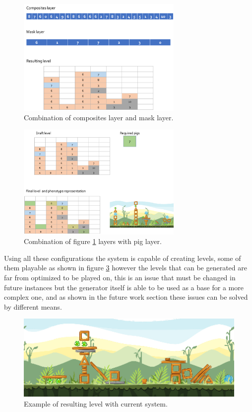 \documentclass[conference]{IEEEtran}
\begin{document}
    \begin{figure}[htbp]
        \centerline{\includegraphics[width=80mm]{Images/layer12_combine.png}}
        \caption{Combination of composites layer and mask layer.}
        \label{layer12_combine}
    \end{figure}
    
    \begin{figure}[htbp]
        \centerline{\includegraphics[width=80mm]{Images/layer123_combine.png}}
        \caption{Combination of figure \ref{layer12_combine} layers with pig layer.}
        \label{layer123_combine}
    \end{figure}
    
    Using all these configurations the system is capable of creating levels, some of
    them playable as shown in figure \ref{result_1} however the levels that can be
    generated are far from optimized to be played on, this is an issue that must be
    changed in future instances but the generator itself is able to be used as a
    base for a more complex one, and as shown in the future work section these issues
    can be solved by different means.
    
    \begin{figure}[htbp]
        \centerline{\includegraphics[width=160mm]{Images/Result_n2.png}}
        \caption{Example of resulting level with current system.}
        \label{result_1}
    \end{figure}
    
\end{document}
